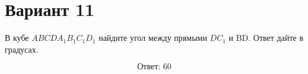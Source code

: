 \documentclass[12pt,a4paper]{article}
\begin{document}
\section*{Вариант 11}

В кубе \(ABCDA_1B_1C_1D_1\) найдите угол между прямыми \(DC_1\) и BD. Ответ дайте в градусах.

\begin{center}
\end{center}

\[
\boxed{\text{Ответ: }60}
\]
\end{document}
